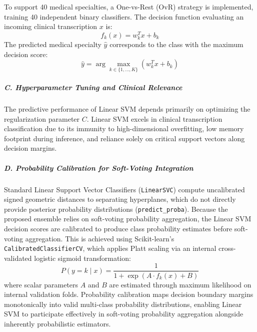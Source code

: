 To support 40 medical specialties, a One-vs-Rest (OvR) strategy is implemented, training 40 independent binary classifiers. The decision function evaluating an incoming clinical transcription $x$ is:
\begin{equation}
f_k(x) = w_k^T x + b_k
\end{equation}
The predicted medical specialty $\hat{y}$ corresponds to the class with the maximum decision score:
\begin{equation}
\hat{y} = \arg\max_{k \in \{1, \dots, K\}} (w_k^T x + b_k)
\end{equation}

\subparagraph{C. Hyperparameter Tuning and Clinical Relevance}
The predictive performance of Linear SVM depends primarily on optimizing the regularization parameter $C$. Linear SVM excels in clinical transcription classification due to its immunity to high-dimensional overfitting, low memory footprint during inference, and reliance solely on critical support vectors along decision margins.

\subparagraph{D. Probability Calibration for Soft-Voting Integration}
Standard Linear Support Vector Classifiers (\texttt{LinearSVC}) compute uncalibrated signed geometric distances to separating hyperplanes, which do not directly provide posterior probability distributions (\texttt{predict\_proba}). Because the proposed ensemble relies on soft-voting probability aggregation, the Linear SVM decision scores are calibrated to produce class probability estimates before soft-voting aggregation. This is achieved using Scikit-learn's \texttt{CalibratedClassifierCV}, which applies Platt scaling via an internal cross-validated logistic sigmoid transformation:
\begin{equation}
P(y = k \mid x) = \frac{1}{1 + \exp(A \cdot f_k(x) + B)}
\end{equation}
where scalar parameters $A$ and $B$ are estimated through maximum likelihood on internal validation folds. Probability calibration maps decision boundary margins monotonically into valid multi-class probability distributions, enabling Linear SVM to participate effectively in soft-voting probability aggregation alongside inherently probabilistic estimators.

